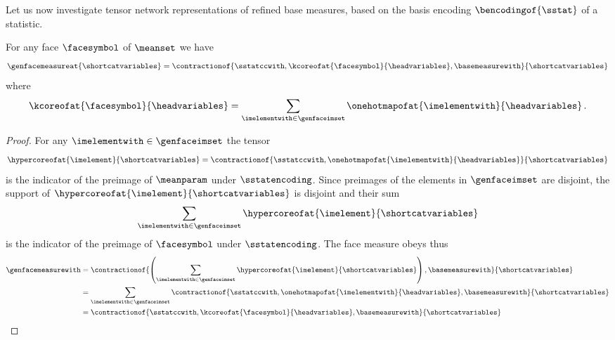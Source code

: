 Let us now investigate tensor network representations of refined base measures, based on the basis encoding $\bencodingof{\sstat}$ of a statistic.

\begin{theorem}
    \label{the:faceMeasureCharacterization}
    For any face $\facesymbol$ of $\meanset$ we have
    \begin{align*}
        \genfacemeasureat{\shortcatvariables}
        =\contractionof{\sstatccwith,\kcoreofat{\facesymbol}{\headvariables},\basemeasurewith}{\shortcatvariables}
    \end{align*}
    where
    \begin{align*}
        \kcoreofat{\facesymbol}{\headvariables}
        = \sum_{\imelementwith\in\genfaceimset} \onehotmapofat{\imelementwith}{\headvariables} \, .
    \end{align*}
\end{theorem}
\begin{proof}
    For any $\imelementwith\in\genfaceimset$ the tensor
    \begin{align*}
        \hypercoreofat{\imelement}{\shortcatvariables}
        = \contractionof{\sstatccwith,\onehotmapofat{\imelementwith}{\headvariables}}{\shortcatvariables}
    \end{align*}
    is the indicator of the preimage of $\meanparam$ under $\sstatencoding$.
    Since preimages of the elements in $\genfaceimset$ are disjoint, the support of $\hypercoreofat{\imelement}{\shortcatvariables}$ is disjoint and their sum
    \begin{align*}
        \sum_{\imelementwith\in\genfaceimset} \hypercoreofat{\imelement}{\shortcatvariables}
    \end{align*}
    is the indicator of the preimage of $\facesymbol$ under $\sstatencoding$.
    The face measure obeys thus
    \begin{align*}
        \genfacemeasurewith
        &= \contractionof{\left(
                              \sum_{\imelementwith\in\genfaceimset} \hypercoreofat{\imelement}{\shortcatvariables}
        \right), \basemeasurewith}{\shortcatvariables} \\
        &= \sum_{\imelementwith\in\genfaceimset}
        \contractionof{\sstatccwith,\onehotmapofat{\imelementwith}{\headvariables},\basemeasurewith}{\shortcatvariables} \\
        & = \contractionof{\sstatccwith,\kcoreofat{\facesymbol}{\headvariables},\basemeasurewith}{\shortcatvariables} \qedhere
    \end{align*}
\end{proof}

